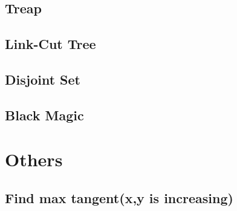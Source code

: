\documentclass[10pt,twocolumn,oneside]{article}
\begin{document}
\subsection{Treap}


\subsection{Link-Cut Tree}


\newpage

\subsection{Disjoint Set}


\subsection{Black Magic}


\newpage

\section{Others}

\subsection{Find max tangent(x,y is increasing)}


% 
\end{document}
